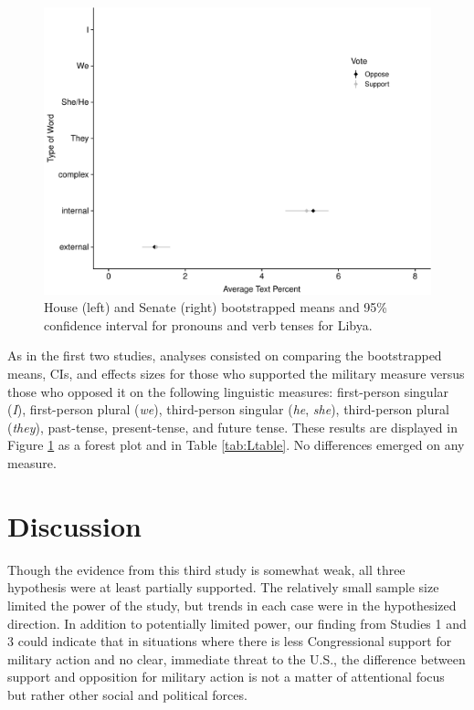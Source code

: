 \documentclass[english,,man]{apa6}
\begin{document}
\begin{figure}
\centering
\includegraphics{Language_of_War_Markdown_KJ2_files/figure-latex/Lpic-1.pdf}
\caption{\label{fig:Lpic}House (left) and Senate (right) bootstrapped means and 95\% confidence interval for pronouns and verb tenses for Libya.}
\end{figure}

As in the first two studies, analyses consisted on comparing the bootstrapped means, CIs, and effects sizes for those who supported the military measure versus those who opposed it on the following linguistic measures: first-person singular (\emph{I}), first-person plural (\emph{we}), third-person singular (\emph{he}, \emph{she}), third-person plural (\emph{they}), past-tense, present-tense, and future tense. These results are displayed in Figure \ref{fig:Lpic} as a forest plot and in Table \ref{tab:Ltable}. No differences emerged on any measure.

\hypertarget{discussion-2}{%
\section{Discussion}\label{discussion-2}}

Though the evidence from this third study is somewhat weak, all three hypothesis were at least partially supported. The relatively small sample size limited the power of the study, but trends in each case were in the hypothesized direction. In addition to potentially limited power, our finding from Studies 1 and 3 could indicate that in situations where there is less Congressional support for military action and no clear, immediate threat to the U.S., the difference between support and opposition for military action is not a matter of attentional focus but rather other social and political forces.
\end{document}
